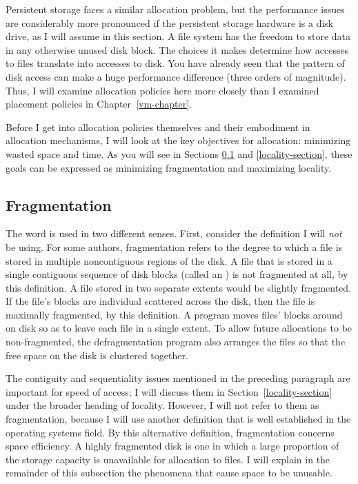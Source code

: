 Persistent storage faces a similar allocation problem, but the
performance issues are considerably more pronounced if the persistent
storage hardware is a disk drive, as I will assume in this section.  A file system
has the freedom to store data in any
otherwise unused disk block.  The choices it makes determine how
accesses to files translate into accesses to disk.  You have already seen
that the pattern of disk access can make a huge performance difference
(three orders of magnitude).  Thus, I will examine allocation
policies here more closely than I examined placement policies in
Chapter~\ref{vm-chapter}.

Before I get into allocation policies themselves and their
embodiment in allocation mechanisms, I will
look at the key objectives for allocation: minimizing wasted space
and time.  As you will see in Sections \ref{fragmentation-section} and
\ref{locality-section}, these goals can be
expressed as minimizing fragmentation and maximizing locality.

\subsection{Fragmentation}\label{fragmentation-section}

The word  is used in two different senses.
First, consider the definition I will \emph{not} be using.  For
some authors, fragmentation refers to the degree to which a file is
stored in multiple noncontiguous regions of the disk.  A file that is
stored in a single contiguous sequence of disk blocks (called an
) is not fragmented at all, by this definition.
A file stored in two separate extents would be
slightly fragmented.  If the file's blocks are individual scattered
across the disk, then the file is maximally fragmented, by this
definition.  A
 program moves files' blocks around on disk so
as to leave each file in a single extent.  To allow future allocations
to be non-fragmented, the defragmentation program also arranges the
files so that the free space on the disk is clustered together.

The contiguity and sequentiality issues mentioned in the preceding
paragraph are important for speed of access; I will discuss them in
Section~\ref{locality-section} under the broader heading of locality.  However,
I will not refer to them as fragmentation, because I will use
another definition that is well established in the
operating systems field.  By this alternative definition,
fragmentation concerns space efficiency.  A highly fragmented disk is
one in which a large proportion of the storage capacity is unavailable
for allocation to files.  I will explain in the remainder of this
subsection the phenomena that cause space to be unusable.

